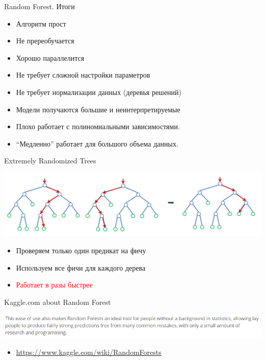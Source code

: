\documentclass[10pt]{beamer}
\begin{document}
\begin{frame}{Random Forest. Итоги}
\begin{itemize}
    \item[\color{green}\ding{52}] Алгоритм прост
    \item[\color{green}\ding{52}] Не пререобучается
    \item[\color{green}\ding{52}] Хорошо параллелится
    \item[\color{green}\ding{52}] Не требует сложной настройки параметров
    \item[\color{green}\ding{52}] Не требует нормализации данных (деревья решений)
    \item[\color{red}\ding{54}] Модели получаются большие и неинтерпретируемые
    \item[\color{red}\ding{54}] Плохо работает с полиномиальными зависимостями.
    \item[\color{red}\ding{54}] ``Медленно'' работает для большого объема данных.
\end{itemize}
\end{frame}

\begin{frame}{Extremely Randomized Trees}
\begin{center}
    \includegraphics[scale=0.2]{images/ert.png}
\end{center}
\begin{itemize}
    \item Проверяем только один предикат на фичу
    \item Используем все фичи для каждого дерева
    \item \textcolor{red}{Работает в разы быстрее}
\end{itemize}
\end{frame}

\begin{frame}{Kaggle.com about Random Forest}
\begin{center}
    \includegraphics[scale=0.35]{images/kaggle.png}
\end{center}
\begin{itemize}
    \item \url{https://www.kaggle.com/wiki/RandomForests}
\end{itemize}
\end{frame}
\end{document}

